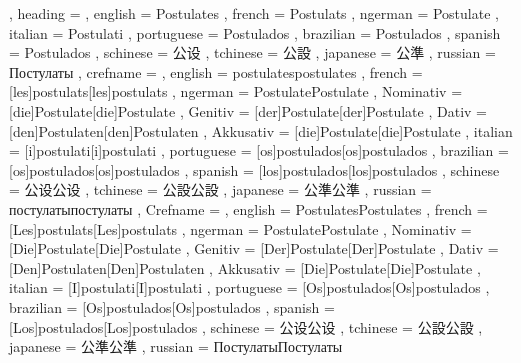   {
    , heading =   {
                    , english     = Postulates
                    , french      = Postulats
                    , ngerman     = Postulate
                    , italian     = Postulati
                    , portuguese  = Postulados
                    , brazilian   = Postulados
                    , spanish     = Postulados
                    , schinese    = 公设
                    , tchinese    = 公設
                    , japanese    = 公準
                    , russian     = Постулаты
                  }
    , crefname =  {
                    , english     = {postulates}{postulates}
                    , french      = [les]{postulats}[les]{postulats}
                    , ngerman     = { {Postulate}{Postulate}
                                      , Nominativ = [die]{Postulate}[die]{Postulate}
                                      , Genitiv   = [der]{Postulate}[der]{Postulate}
                                      , Dativ     = [den]{Postulaten}[den]{Postulaten}
                                      , Akkusativ = [die]{Postulate}[die]{Postulate}
                                    }
                    , italian     = [i]{postulati}[i]{postulati}
                    , portuguese  = [os]{postulados}[os]{postulados}
                    , brazilian   = [os]{postulados}[os]{postulados}
                    , spanish     = [los]{postulados}[los]{postulados}
                    , schinese    = {公设}{公设}
                    , tchinese    = {公設}{公設}
                    , japanese    = {公準}{公準}
                    , russian     = {постулаты}{постулаты}
                  }
    , Crefname =  {
                    , english     = {Postulates}{Postulates}
                    , french      = [Les]{postulats}[Les]{postulats}
                    , ngerman     = { {Postulate}{Postulate}
                                      , Nominativ = [Die]{Postulate}[Die]{Postulate}
                                      , Genitiv   = [Der]{Postulate}[Der]{Postulate}
                                      , Dativ     = [Den]{Postulaten}[Den]{Postulaten}
                                      , Akkusativ = [Die]{Postulate}[Die]{Postulate}
                                    }
                    , italian     = [I]{postulati}[I]{postulati}
                    , portuguese  = [Os]{postulados}[Os]{postulados}
                    , brazilian   = [Os]{postulados}[Os]{postulados}
                    , spanish     = [Los]{postulados}[Los]{postulados}
                    , schinese    = {公设}{公设}
                    , tchinese    = {公設}{公設}
                    , japanese    = {公準}{公準}
                    , russian     = {Постулаты}{Постулаты}
                  }
  }

